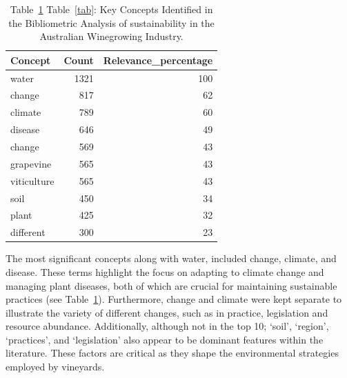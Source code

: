 \documentclass[fleqn,10pt]{wlscirep}
\begin{document}

\begin{table}[h]\label{tab:lexi}
    \caption{Table~\ref{tab:lexi} Table~\ref{tab}: Key Concepts Identified in the Bibliometric Analysis of sustainability in the Australian Winegrowing Industry.}
    \begin{tabular}{@{}lrr@{}}
    \toprule
    \textbf{Concept} & \multicolumn{1}{l}{\textbf{Count}} & \multicolumn{1}{l}{\textbf{Relevance_percentage}} \\ \midrule
    water & 1321 & 100 \\
    change & 817 & 62 \\
    climate & 789 & 60 \\
    disease & 646 & 49 \\
    change & 569 & 43 \\
    grapevine & 565 & 43 \\
    viticulture & 565 & 43 \\
    soil & 450 & 34 \\
    plant & 425 & 32 \\
    different & 300 & 23 \\ \bottomrule
    \end{tabular}
    \end{table}

% 

The most significant concepts along with water, included change, climate, and disease. These terms highlight the focus on adapting to climate change and managing plant diseases, both of which are crucial for maintaining sustainable practices (see Table~\ref{tab:lexi}). Furthermore, change and climate were kept separate to illustrate the variety of different changes, such as in practice, legislation and resource abundance. Additionally, although not in the top 10; `soil', `region', `practices', and `legislation' also appear to be dominant features within the literature. These factors are critical as they shape the environmental strategies employed by vineyards.
\end{document}
